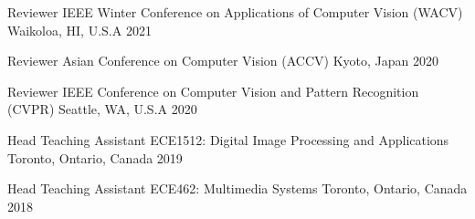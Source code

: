 

\begin{cvhonors}

  \cvhonor
    {Reviewer} %
    {IEEE Winter Conference on Applications of Computer Vision (WACV)} %
    {Waikoloa, HI, U.S.A} %
    {2021} %

  \cvhonor
    {Reviewer} %
    {Asian Conference on Computer Vision (ACCV)} %
    {Kyoto, Japan} %
    {2020} %

  \cvhonor
    {Reviewer} %
    {IEEE Conference on Computer Vision and Pattern Recognition (CVPR)} %
    {Seattle, WA, U.S.A} %
    {2020} %

\end{cvhonors}


\begin{cvhonors}

  \cvhonor
    {Head Teaching Assistant} %
    {ECE1512: Digital Image Processing and Applications} %
    {Toronto, Ontario, Canada} %
    {2019} %

  \cvhonor
    {Head Teaching Assistant} %
    {ECE462: Multimedia Systems} %
    {Toronto, Ontario, Canada} %
    {2018} %
		
\end{cvhonors}